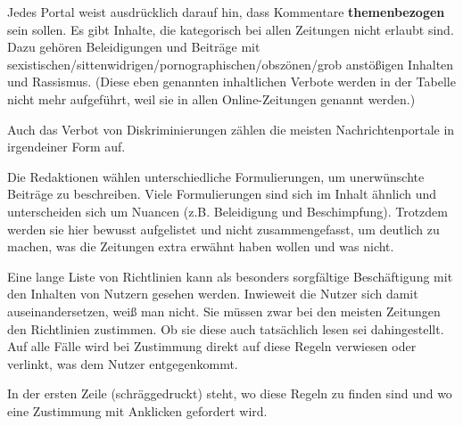 Jedes Portal weist ausdrücklich darauf hin, dass Kommentare {\bfseries
themenbezogen} sein sollen.  Es gibt Inhalte, die kategorisch bei allen
Zeitungen nicht erlaubt sind. Dazu gehören Beleidigungen und Beiträge mit
se\-xi\-sti\-schen/sit\-ten\-wi\-dri\-gen/por\-no\-gra\-phi\-schen/obs\-zö\-nen/grob
anstößigen Inhalten und Rassismus. (Diese eben genannten inhaltlichen Verbote
werden in der Tabelle nicht mehr aufgeführt, weil sie in allen Online-Zeitungen
genannt werden.)

Auch das Verbot von Diskriminierungen zählen die meisten Nachrichtenportale in
irgendeiner Form auf.

Die Redaktionen wählen unterschiedliche Formulierungen, um unerwünschte Beiträge
zu beschreiben. Viele Formulierungen sind sich im Inhalt ähnlich  und
unterscheiden sich um Nuancen (z.B. Beleidigung und Beschimpfung). Trotzdem
werden sie hier bewusst aufgelistet und nicht zusammengefasst, um deutlich zu
machen, was die Zeitungen extra erwähnt haben wollen und was nicht.

Eine lange Liste von Richtlinien kann als besonders sorgfältige Beschäftigung mit 
den Inhalten von Nutzern gesehen werden. Inwieweit die Nutzer sich damit 
auseinandersetzen, weiß man nicht. Sie müssen zwar bei den meisten Zeitungen
den Richtlinien zustimmen. Ob sie diese auch tatsächlich lesen sei dahingestellt.
Auf alle Fälle wird bei Zustimmung direkt auf diese Regeln verwiesen oder verlinkt, was
dem Nutzer entgegenkommt.

In der ersten Zeile (schräggedruckt) steht, wo diese Regeln zu finden sind und wo eine 
Zustimmung mit Anklicken gefordert wird.

